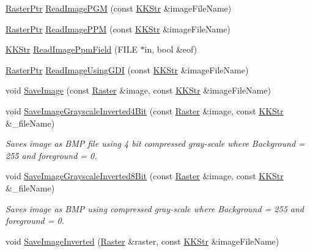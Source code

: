 \begin{DoxyCompactItemize}
\item 
\hyperlink{namespace_k_k_b_a80d46bd24db644a022c863bce8ae3633}{Raster\+Ptr} \hyperlink{namespace_k_k_b_a48f622be009a3055d0b86d20adf0d6d3}{Read\+Image\+P\+GM} (const \hyperlink{class_k_k_b_1_1_k_k_str}{K\+K\+Str} \&image\+File\+Name)
\item 
\hyperlink{namespace_k_k_b_a80d46bd24db644a022c863bce8ae3633}{Raster\+Ptr} \hyperlink{namespace_k_k_b_a722a5b8c478ea435da42d7ac35a50625}{Read\+Image\+P\+PM} (const \hyperlink{class_k_k_b_1_1_k_k_str}{K\+K\+Str} \&image\+File\+Name)
\item 
\hyperlink{class_k_k_b_1_1_k_k_str}{K\+K\+Str} \hyperlink{namespace_k_k_b_ade6c5f0d9736c3f249ae35cd3d067151}{Read\+Image\+Ppm\+Field} (F\+I\+LE $\ast$in, bool \&eof)
\item 
\hyperlink{namespace_k_k_b_a80d46bd24db644a022c863bce8ae3633}{Raster\+Ptr} \hyperlink{namespace_k_k_b_a9e18a731c85527473c3f48c65ccb379e}{Read\+Image\+Using\+G\+DI} (const \hyperlink{class_k_k_b_1_1_k_k_str}{K\+K\+Str} \&image\+File\+Name)
\item 
void \hyperlink{namespace_k_k_b_a79418a91c1f41864f9b0047aa01b52bc}{Save\+Image} (const \hyperlink{class_k_k_b_1_1_raster}{Raster} \&image, const \hyperlink{class_k_k_b_1_1_k_k_str}{K\+K\+Str} \&image\+File\+Name)
\item 
void \hyperlink{namespace_k_k_b_a43b1434ebafb3a632b4957ef8313976e}{Save\+Image\+Grayscale\+Inverted4\+Bit} (const \hyperlink{class_k_k_b_1_1_raster}{Raster} \&image, const \hyperlink{class_k_k_b_1_1_k_k_str}{K\+K\+Str} \&\+\_\+file\+Name)
\begin{DoxyCompactList}\small\item\em Saves image as B\+MP file using 4 bit compressed gray-\/scale where Background = 255 and foreground = 0. \end{DoxyCompactList}\item 
void \hyperlink{namespace_k_k_b_a47ede5d989d5855f609efb99fe140977}{Save\+Image\+Grayscale\+Inverted8\+Bit} (const \hyperlink{class_k_k_b_1_1_raster}{Raster} \&image, const \hyperlink{class_k_k_b_1_1_k_k_str}{K\+K\+Str} \&\+\_\+file\+Name)
\begin{DoxyCompactList}\small\item\em Saves image as B\+MP using compressed gray-\/scale where Background = 255 and foreground = 0. \end{DoxyCompactList}\item 
void \hyperlink{namespace_k_k_b_a2a4d175ff25df52c9eed2872e07b83b5}{Save\+Image\+Inverted} (\hyperlink{class_k_k_b_1_1_raster}{Raster} \&raster, const \hyperlink{class_k_k_b_1_1_k_k_str}{K\+K\+Str} \&image\+File\+Name)

\end{DoxyCompactItemize}
